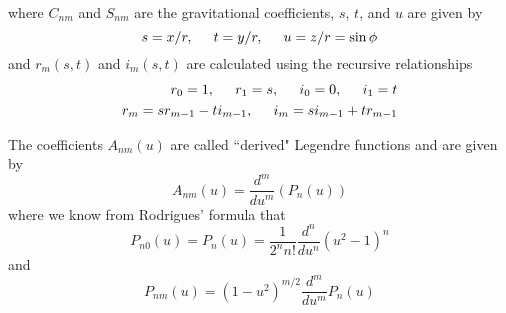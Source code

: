 %
where $C_{nm}$ and $S_{nm}$ are the gravitational coefficients, $s$,
$t$, and $u$ are given by
%
\begin{equation}
     s = x/r, \hspace{.2 in} t = y/r, \hspace{.2 in} u = z/r =
     \sin{\phi} \nonumber
\end{equation}
%
and $r_m(s,t)$ and $i_m(s,t)$ are calculated using the recursive
relationships
%
\begin{equation}
    \begin{split}
        r_0 = 1, \hspace{.2 in} r_1 = s, \hspace{.2 in} i_0 = 0,
        \hspace{.2 in} i_1 = t \nonumber\\
        r_m = sr_{m-1} - ti_{m-1}, \hspace{ .2 in} i_m = si_{m-1} +
        tr_{m-1} \nonumber
    \end{split}
\end{equation}


The coefficients $A_{nm}(u)$ are called ``derived" Legendre
functions and are given by
%
\begin{equation}
    A_{nm}(u) = \frac{d^m}{du^m}(P_n(u))
\end{equation}
%
where we know from Rodrigues' \cite{Lundberg:88} formula that
%
\begin{equation}
    P_{n0}(u) = P_n(u) = \frac{1}{2^n n!}\frac{d^n}{du^n}(u^2 - 1)^n
\end{equation}
%
and
%
\begin{equation}
    P_{nm}(u) = (1 - u^2)^{m/2}\frac{d^m}{du^m}P_n(u)
\end{equation}
%

